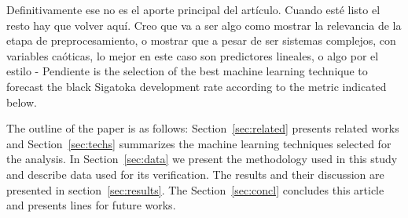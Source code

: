 %
{Definitivamente ese no es el aporte principal del artículo.  Cuando
  esté listo el resto hay que volver aquí.  Creo que va a ser algo
  como mostrar la relevancia de la etapa de preprocesamiento, o
  mostrar que a pesar de ser sistemas complejos, con variables
  caóticas, lo mejor en este caso son predictores lineales, o algo por
  el estilo - Pendiente} %
% 
 is the selection of the best machine learning technique
to forecast the black Sigatoka development rate according to the
metric indicated below.

The outline of the paper is as follows: Section~\ref{sec:related}
presents related works and Section~\ref{sec:techs} summarizes the
machine learning techniques selected for the analysis. In
Section~\ref{sec:data} we present the methodology used in this study
and describe data used for its verification.  The results and their
discussion are presented in section~\ref{sec:results}.  The
Section~\ref{sec:concl} concludes this article and presents lines for
future works.

